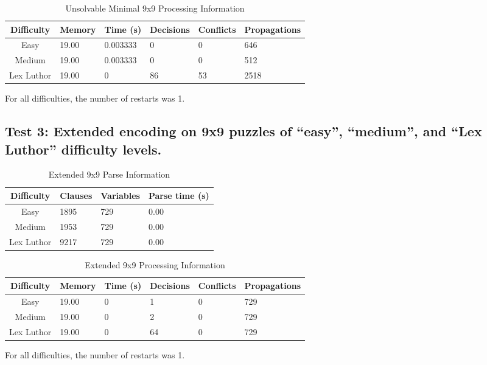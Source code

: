 \documentclass[conference,draftclsnofoot]{IEEEtran}
\begin{document}
\begin{table}[!h]
	\centering
	\begin{tabular}{c | l l p{20pt} p{20pt}  l }
		Difficulty & Memory & Time (s) & Decisions &
		Conflicts & Propagations \\\hline
		Easy 		& 19.00 & 0.003333 & 0  & 0  & 646 \\
		Medium 		& 19.00 & 0.003333 & 0  & 0  & 512 \\
		Lex Luthor 	& 19.00 & 0 	   & 86 & 53 & 2518
	\end{tabular}
	\caption{Unsolvable Minimal 9x9 Processing Information}

	\label{tab:summary}
	For all difficulties, the number of restarts was 1.

\end{table}

\subsection{Test 3: Extended encoding on 9x9 puzzles of ``easy'', ``medium'',
and ``Lex Luthor'' difficulty levels.}

\begin{table}[!h]
	\centering
	\begin{tabular}{c | l l l}
		Difficulty & Clauses & Variables & Parse time (s) \\\hline
		Easy 		& 1895 & 729 & 0.00 \\
		Medium 		& 1953 & 729 & 0.00 \\
		Lex Luthor 	& 9217 & 729 & 0.00
	\end{tabular}
	\caption{Extended 9x9 Parse Information}
	\label{tab:summary}
\end{table}

\begin{table}[!h]
	\centering
	\begin{tabular}{c | l l p{20pt} p{20pt} l}
		Difficulty & Memory & Time (s) & Decisions &
		Conflicts & Propagations \\\hline
		Easy 		& 19.00 & 0 	& 1  & 0 & 729\\
		Medium 		& 19.00 & 0 	& 2  & 0 & 729\\
		Lex Luthor 	& 19.00 & 0 	& 64 & 0 & 729
	\end{tabular}
	\caption{Extended 9x9 Processing Information}

	\label{tab:summary}
	For all difficulties, the number of restarts was 1.
\end{table}
\end{document}
